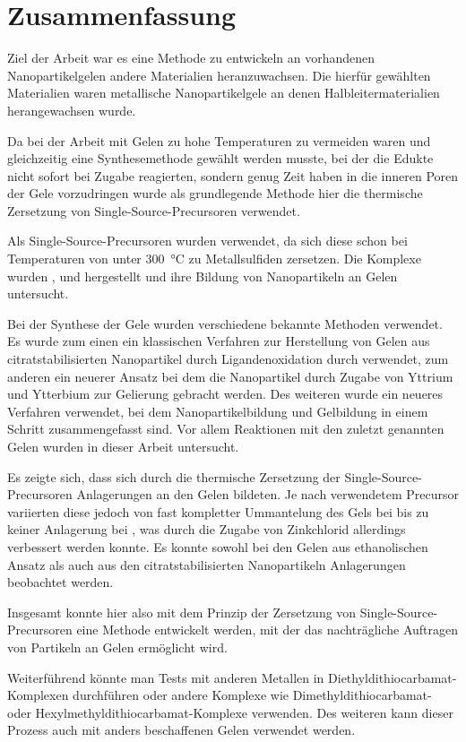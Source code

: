 \section{Zusammenfassung}

Ziel der Arbeit war es eine Methode zu entwickeln an vorhandenen Nanopartikelgelen andere Materialien heranzuwachsen.
Die hierfür gewählten Materialien waren metallische Nanopartikelgele an denen Halbleitermaterialien herangewachsen wurde.

Da bei der Arbeit mit Gelen zu hohe Temperaturen zu vermeiden waren und gleichzeitig eine Synthesemethode gewählt werden musste, bei der die Edukte nicht sofort bei Zugabe reagierten, sondern genug Zeit haben in die inneren Poren der Gele vorzudringen wurde als grundlegende Methode hier die thermische Zersetzung von Single-Source-Precursoren verwendet.

Als Single-Source-Precursoren wurden   verwendet, da sich diese schon bei Temperaturen von unter \SI{300}{\degreeCelsius} zu Metallsulfiden zersetzen.
Die Komplexe wurden ,  und  hergestellt und ihre Bildung von Nanopartikeln an Gelen untersucht.

Bei der Synthese der Gele wurden verschiedene bekannte Methoden verwendet.
Es wurde zum einen ein klassischen Verfahren zur Herstellung von Gelen aus citratstabilisierten Nanopartikel durch Ligandenoxidation durch  verwendet,
zum anderen ein neuerer Ansatz bei dem die Nanopartikel durch Zugabe von Yttrium und Ytterbium zur Gelierung gebracht werden.
Des weiteren wurde ein neueres Verfahren verwendet, bei dem Nanopartikelbildung und Gelbildung in einem Schritt zusammengefasst sind.
Vor allem Reaktionen mit den zuletzt genannten Gelen wurden in dieser Arbeit untersucht.

Es zeigte sich, dass sich durch die thermische Zersetzung der Single-Source-Precursoren Anlagerungen an den Gelen bildeten.
Je nach verwendetem Precursor variierten diese jedoch von fast kompletter Ummantelung des Gels bei  bis zu keiner Anlagerung bei , was durch die Zugabe von Zinkchlorid allerdings verbessert werden konnte.
Es konnte sowohl bei den Gelen aus ethanolischen Ansatz als auch aus den citratstabilisierten Nanopartikeln Anlagerungen beobachtet werden.

Insgesamt konnte hier also mit dem Prinzip der Zersetzung von Single-Source-Precursoren eine Methode entwickelt werden, mit der das nachträgliche Auftragen von Partikeln an Gelen ermöglicht wird.

Weiterführend könnte man Tests mit anderen Metallen in Diethyldithiocarbamat-Komplexen durchführen oder andere Komplexe wie Dimethyldithiocarbamat- oder Hexylmethyldithiocarbamat-Komplexe verwenden.
Des weiteren kann dieser Prozess auch mit anders beschaffenen Gelen verwendet werden.